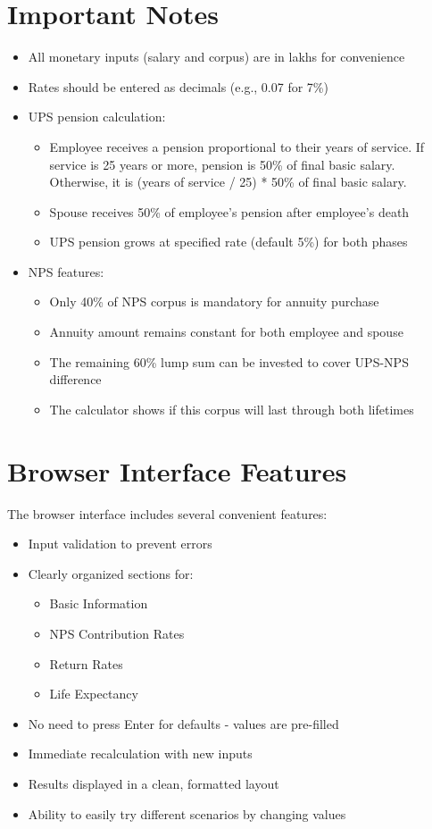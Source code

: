 \documentclass{article}
\begin{document}
\section{Important Notes}
\begin{itemize}
    \item All monetary inputs (salary and corpus) are in lakhs for convenience
    \item Rates should be entered as decimals (e.g., 0.07 for 7\%)
    \item UPS pension calculation:
    \begin{itemize}
        \item Employee receives a pension proportional to their years of service. If service is 25 years or more, pension is 50\% of final basic salary. Otherwise, it is (years of service / 25) * 50\% of final basic salary.
        \item Spouse receives 50\% of employee's pension after employee's death
        \item UPS pension grows at specified rate (default 5\%) for both phases
    \end{itemize}
    \item NPS features:
    \begin{itemize}
        \item Only 40\% of NPS corpus is mandatory for annuity purchase
        \item Annuity amount remains constant for both employee and spouse
        \item The remaining 60\% lump sum can be invested to cover UPS-NPS difference
        \item The calculator shows if this corpus will last through both lifetimes
    \end{itemize}
\end{itemize}

\section{Browser Interface Features}
The browser interface includes several convenient features:
\begin{itemize}
    \item Input validation to prevent errors
    \item Clearly organized sections for:
    \begin{itemize}
        \item Basic Information
        \item NPS Contribution Rates
        \item Return Rates
        \item Life Expectancy
    \end{itemize}
    \item No need to press Enter for defaults - values are pre-filled
    \item Immediate recalculation with new inputs
    \item Results displayed in a clean, formatted layout
    \item Ability to easily try different scenarios by changing values
\end{itemize}
\end{document}
